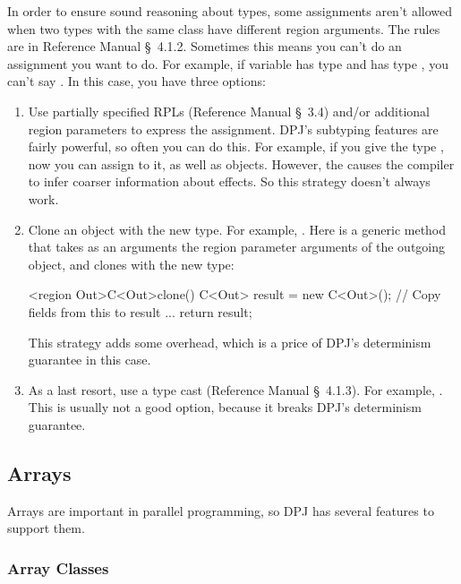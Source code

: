  In order to ensure sound reasoning
about types, some assignments aren't allowed when two types with the
same class have different region arguments.  The rules are in
Reference Manual \S~4.1.2.  Sometimes this means you can't do an
assignment you want to do.  For example, if variable  has type
 and  has type , you can't say .
In this case, you have three options:
%
\begin{enumerate}
%
\item Use partially specified RPLs (Reference Manual \S~3.4) and/or
  additional region parameters to express the assignment.  DPJ's
  subtyping features are fairly powerful, so often you can do this.
  For example, if you give  the type , now you can
  assign  to it, as well as  objects.  However, the
  \kwd{*} causes the compiler to infer coarser information about
  effects.  So this strategy doesn't always work.
%
\item Clone an object with the new type.  For example, . Here  is a generic method that takes as an
  arguments the region parameter arguments of the outgoing object, and
  clones  with the new type:
\begin{dpjlisting}
<region Out>C<Out>clone() {
    C<Out> result = new C<Out>();
    // Copy fields from this to result
    ...
    return result;
}
\end{dpjlisting}
%
This strategy adds some overhead, which is a price of DPJ's
determinism guarantee in this case.
%
\item As a last resort, use a type cast (Reference Manual
  \S~4.1.3). For example, .  This is usually not a
  good option, because it breaks DPJ's determinism guarantee.
%
\end{enumerate}

\subsection{Arrays}

Arrays are important in parallel programming, so DPJ has several
features to support them.

\subsubsection{Array Classes}

